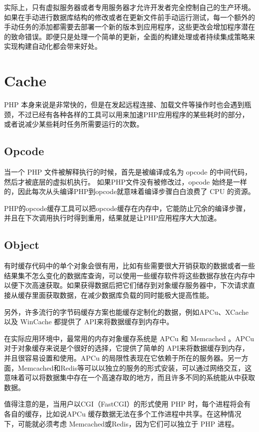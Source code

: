 实际上，只有虚拟服务器或者专用服务器才允许开发者完全控制自己的生产环境。如果在手动进行数据库结构的修改或者在更新文件前手动运行测试，每一个额外的手动任务的添加都需要去部署一个新的版本到应用程序，这些更改会增加程序潜在的致命错误。即便只是处理一个简单的更新，全面的构建处理或者持续集成策略来实现构建自动化都会带来好处。

\section{Cache}

PHP 本身来说是非常快的，但是在发起远程连接、加载文件等操作时也会遇到瓶颈，不过已经有各种各样的工具可以用来加速PHP应用程序的某些耗时的部分，或者说减少某些耗时任务所需要运行的次数。

\subsection{Opcode}


当一个 PHP 文件被解释执行的时候，首先是被编译成名为 opcode 的中间代码，然后才被底层的虚拟机执行。 如果PHP文件没有被修改过，opcode 始终是一样的，因此每次从头编译PHP到opcode就意味着编译步骤白白浪费了 CPU 的资源。

PHP的opcode缓存工具可以把opcode缓存在内存中，它能防止冗余的编译步骤，并且在下次调用执行时得到重用，结果就是让PHP应用程序大大加速。

\subsection{Object}

有时缓存代码中的单个对象会很有用，比如有些需要很大开销获取的数据或者一些结果集不怎么变化的数据库查询，可以使用一些缓存软件将这些数据存放在内存中以便下次高速获取。如果获得数据后把它们储存到对象缓存服务器中，下次请求直接从缓存里面获取数据，在减少数据库负载的同时能极大提高性能。

另外，许多流行的字节码缓存方案也能缓存定制化的数据，例如APCu、XCache 以及 WinCache 都提供了 API来将数据缓存到内存中。

在实际应用环境中，最常用的内存对象缓存系统是 APCu 和 Memcached 。APCu 对于对象缓存来说是个很好的选择，它提供了简单的 API来将数据缓存到内存，并且很容易设置和使用。APCu 的局限性表现在它依赖于所在的服务器。另一方面，Memcached和Redis等可以以独立的服务的形式安装，可以通过网络交互，这意味着可以将数据集中存在一个高速存取的地方，而且许多不同的系统能从中获取数据。

值得注意的是，当用户以CGI（FastCGI）的形式使用 PHP 时，每个进程将会有各自的缓存，比如说APCu 缓存数据无法在多个工作进程中共享。在这种情况下，可能就必须考虑 Memcached或Redis，因为它们可以独立于 PHP 进程。


